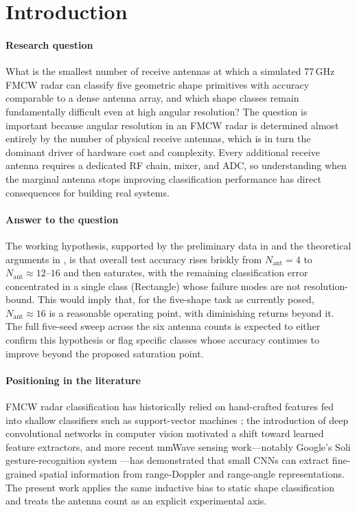 \documentclass[letterpaper,11pt,leqno]{article}
\begin{document}
\section{Introduction}\label{s:introduction}

\paragraph{Research question} What is the smallest number of receive antennas at which a simulated 77\,GHz FMCW radar can classify five geometric shape primitives with accuracy comparable to a dense antenna array, and which shape classes remain fundamentally difficult even at high angular resolution? The question is important because angular resolution in an FMCW radar is determined almost entirely by the number of physical receive antennas, which is in turn the dominant driver of hardware cost and complexity. Every additional receive antenna requires a dedicated RF chain, mixer, and ADC, so understanding when the marginal antenna stops improving classification performance has direct consequences for building real systems.

\paragraph{Answer to the question} The working hypothesis, supported by the preliminary data in  and the theoretical arguments in , is that overall test accuracy rises briskly from $N_{\mathrm{ant}}=4$ to $N_{\mathrm{ant}}\approx 12$--$16$ and then saturates, with the remaining classification error concentrated in a single class (Rectangle) whose failure modes are not resolution-bound. This would imply that, for the five-shape task as currently posed, $N_{\mathrm{ant}}\approx 16$ is a reasonable operating point, with diminishing returns beyond it. The full five-seed sweep across the six antenna counts is expected to either confirm this hypothesis or flag specific classes whose accuracy continues to improve beyond the proposed saturation point.

\paragraph{Positioning in the literature} FMCW radar classification has historically relied on hand-crafted features fed into shallow classifiers such as support-vector machines \citep{Cortes95}; the introduction of deep convolutional networks in computer vision \citep{LeCun89,Krizhevsky12} motivated a shift toward learned feature extractors, and more recent mmWave sensing work---notably Google's Soli gesture-recognition system \citep{Lien16}---has demonstrated that small CNNs can extract fine-grained spatial information from range-Doppler and range-angle representations. The present work applies the same inductive bias to static shape classification and treats the antenna count as an explicit experimental axis.
\end{document}
